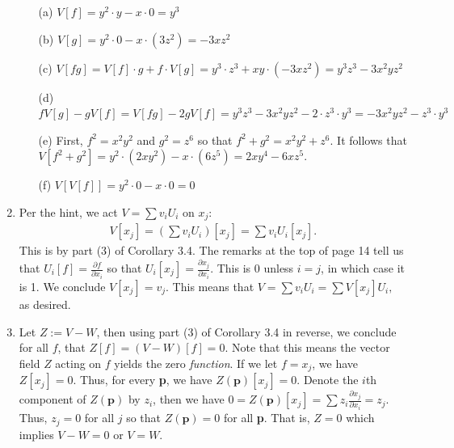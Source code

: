 \documentclass[12pt]{article}
\numberwithin{theorem}{section}
\numberwithin{equation}{section}
\numberwithin{remark}{section}
\numberwithin{definition}{section}
\numberwithin{theorem}{section}
\numberwithin{lemma}{section}
\numberwithin{example}{section}
\begin{document}
\begin{enumerate}
{\begin{enumerate}
			\item[(a)]{$V[f]=y^2\cdot y - x\cdot 0=y^3$}
			\item[(b)]{$V[g]=y^2\cdot0-x\cdot(3z^2)=-3xz^2$}
			\item[(c)]{$V[fg]=V[f]\cdot g + f\cdot V[g]=y^3\cdot z^3+xy\cdot(-3xz^2)=y^3z^3-3x^2yz^2$}
			\item[(d)]{$fV[g]-gV[f]=V[fg]-2gV[f]=y^3z^3-3x^2yz^2-2\cdot z^3\cdot y^3 = -3x^2yz^2 - z^3\cdot y^3$}
			\item[(e)]{First, $f^2=x^2y^2$ and $g^2=z^6$ so that $f^2+g^2=x^2y^2+z^6$. It follows that $V[f^2+g^2]=y^2\cdot(2xy^2)-x\cdot(6z^5)=2xy^4-6xz^5.$}
			\item[(f)]{$V[V[f]]=y^2\cdot0-x\cdot0=0$}
		\end{enumerate}
	}
	\item{Per the hint, we act $V=\sum v_i U_i$ on $x_j$:
		\begin{align*}
		V[x_j] = \left(\sum v_i U_i\right)[x_j] = \sum v_i U_i[x_j].
		\end{align*}
		This is by part (3) of Corollary 3.4. The remarks at the top of page 14 tell us that $U_i[f]=\frac{\partial f}{\partial x_i}$ so that $U_i[x_j]=\frac{\partial x_j}{\partial x_i}$. This is 0 unless $i=j$, in which case it is 1. We conclude $V[x_j] = v_j$. This means that $V=\sum v_i U_i=\sum V[x_j] U_i,$ as desired.
	}
	\item{Let $Z:=V-W$, then using part (3) of Corollary 3.4 in reverse, we conclude for all $f$, that $Z[f]=(V-W)[f]=0$. Note that this means the vector field $Z$ acting on $f$ yields the zero \emph{function}. If we let $f=x_j$, we have $Z[x_j]=0$. Thus, for every \textbf{p}, we have $Z(\textbf{p})[x_j]=0$. Denote the $i$th component of $Z(\textbf{p})$ by $z_i$, then we have $0=Z(\textbf{p})[x_j]=\sum z_i \frac{\partial x_j}{\partial x_i} = z_j$. Thus, $z_j=0$ for all $j$ so that $Z(\textbf{p})=0$ for all \textbf{p}. That is, $Z=0$ which implies $V-W=0$ or $V=W$.}
\end{enumerate}
\end{document}
